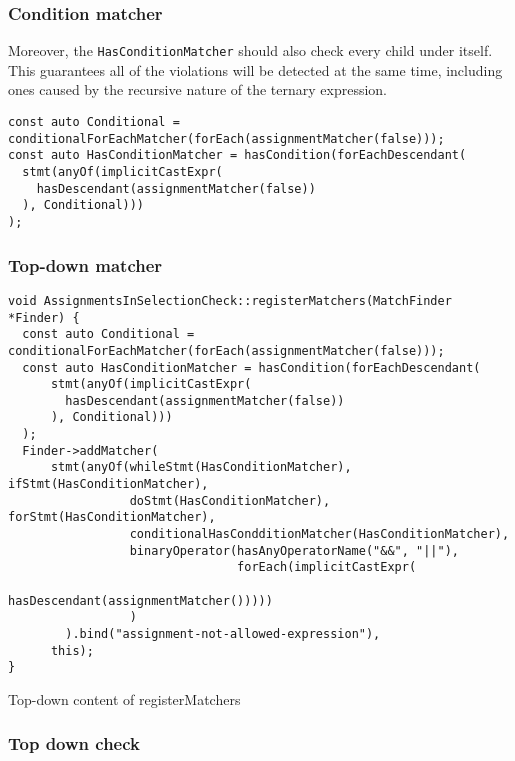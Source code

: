 \subsubsection{Condition matcher}

Moreover, the \lstinline{HasConditionMatcher} should also check every child under itself. This guarantees all of the violations will be detected at the same time, including ones caused by the recursive nature of the ternary expression. 

\begin{listing}[H]
\begin{verbatim}
const auto Conditional = conditionalForEachMatcher(forEach(assignmentMatcher(false)));
const auto HasConditionMatcher = hasCondition(forEachDescendant(
  stmt(anyOf(implicitCastExpr( 
    hasDescendant(assignmentMatcher(false))
  ), Conditional)))
);
\end{verbatim}
\caption{\lstinline{Conditional} and \lstinline{HasConditionMatcher} variables for top-down}
\end{listing}

\subsubsection{Top-down matcher}

\begin{listing}[H]
\begin{verbatim}
void AssignmentsInSelectionCheck::registerMatchers(MatchFinder *Finder) {
  const auto Conditional = conditionalForEachMatcher(forEach(assignmentMatcher(false)));
  const auto HasConditionMatcher = hasCondition(forEachDescendant(
      stmt(anyOf(implicitCastExpr( 
        hasDescendant(assignmentMatcher(false))
      ), Conditional)))
  );
  Finder->addMatcher(
      stmt(anyOf(whileStmt(HasConditionMatcher), ifStmt(HasConditionMatcher),
                 doStmt(HasConditionMatcher), forStmt(HasConditionMatcher),
                 conditionalHasCondditionMatcher(HasConditionMatcher),
                 binaryOperator(hasAnyOperatorName("&&", "||"),
                                forEach(implicitCastExpr(
                                    hasDescendant(assignmentMatcher()))))
                 )
        ).bind("assignment-not-allowed-expression"),
      this);
}
\end{verbatim}
\caption{Top-down content of registerMatchers}
\end{listing}


\subsubsection{Top down check}

